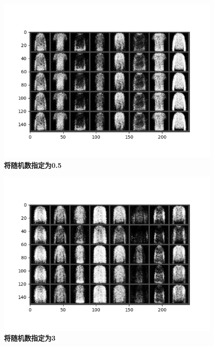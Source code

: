 \documentclass{article}
\begin{document}
\begin{figure}[H]
   \centering
   \includegraphics[scale = 0.5]{1:2.png}
   \caption{\textbf{将随机数指定为0.5}}
\end{figure}
\begin{figure}[H]
   \centering
   \includegraphics[scale = 0.5]{3.png}
   \caption{\textbf{将随机数指定为3}}
\end{figure}
\end{document}
